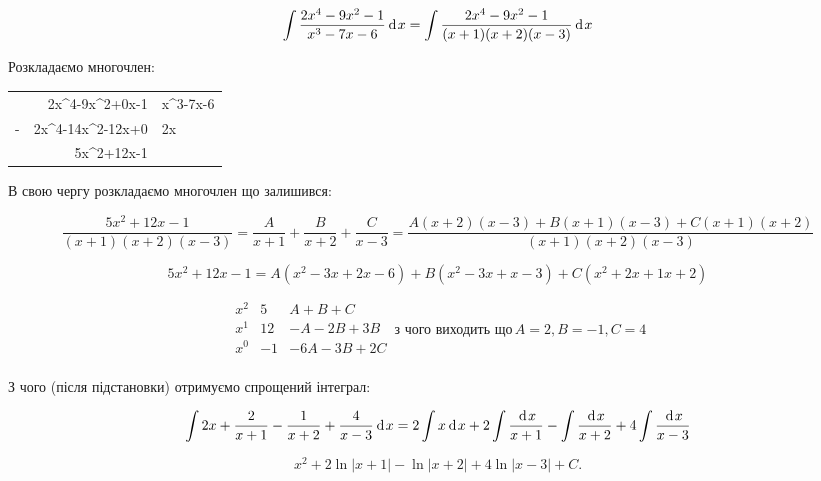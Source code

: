 {}

$$
  \int \dfrac{2x^4-9x^2-1}{x^3-7x-6}\hspace{2pt}\text{d}\hspace{1pt}{x} = \int \dfrac{2x^4-9x^2-1}{(x+1)(x+2)(x-3)}\hspace{2pt}\text{d}\hspace{1pt}{x}
$$

Розкладаємо многочлен:

\begin{center}
  \begin{tabular}{r r | l}
      & 2x^4-9x^2+0x-1   & x^3-7x-6 \\ \cline{3-1}
    - & 2x^4-14x^2-12x+0 & 2x       \\ \cline{2-1}
      &   5x^2+12x-1 & \\

  \end{tabular}
\end{center}

В свою чергу розкладаємо многочлен що залишився:

$$
  \dfrac{5x^2+12x-1}{(x+1)(x+2)(x-3)}
    = \dfrac{A}{x+1} + \dfrac{B}{x+2} + \dfrac{C}{x-3}
    = \dfrac{A(x+2)(x-3)+B(x+1)(x-3)+C(x+1)(x+2)}{(x+1)(x+2)(x-3)}
$$

$$
5x^2+12x-1 = A(x^2-3x+2x-6)+B(x^2-3x+x-3)+C(x^2+2x+1x+2)
$$


$$
  \begin{array}{r|c|r}
    x^2 & 5  & A+B+C      \\
    x^1 & 12  & -A-2B+3B  \\
    x^0 & -1  & -6A-3B+2C \\
    \end{array}
    \hspace{2pt}
    {\text{з чого виходить що}}
    \hspace{2pt}
    A=2, B=-1, C=4
$$

З чого (після підстановки) отримуємо спрощений інтеграл:

$$
   \int 2x + \dfrac{2}{x+1} - \dfrac{1}{x+2} + \dfrac{4}{x-3}  \hspace{2pt}\text{d}\hspace{1pt}{x}
= 2\int x \hspace{2pt}\text{d}\hspace{1pt}{x} + 2 \int \dfrac{\hspace{2pt}\text{d}\hspace{1pt}{x}}{x+1} - \int \dfrac{\hspace{2pt}\text{d}\hspace{1pt}{x}}{x+2} + 4 \int \dfrac{\hspace{2pt}\text{d}\hspace{1pt}{x}}{x-3}
$$

$$
\boxed{x^2 + 2 \ln{|x+1|} - \ln{|x+2|} + 4\ln{|x-3|} + C}.
$$
